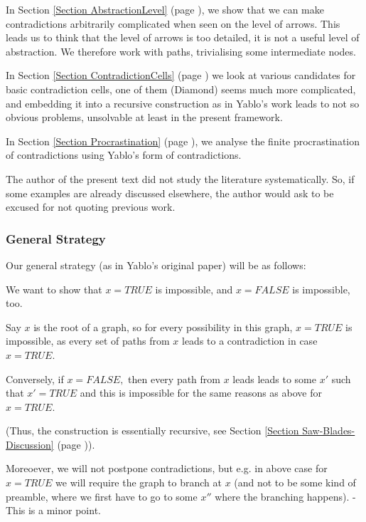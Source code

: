 In Section 
\ref{Section AbstractionLevel} (page 
\pageref{Section AbstractionLevel}),
we show that we can make contradictions arbitrarily complicated when
seen on the level of arrows. This leads us to think that the level of
arrows
is too detailed, it is not a useful level of abstraction.
We therefore work with paths, trivialising some intermediate nodes.


In Section 
\ref{Section ContradictionCells} (page 
\pageref{Section ContradictionCells})
we look at various candidates for basic contradiction cells,
one of them (Diamond) seems much
more complicated, and embedding it into a recursive construction as in
Yablo's work leads to not so obvious problems, unsolvable at least in the
present framework.


In Section 
\ref{Section Procrastination} (page 
\pageref{Section Procrastination}),
we analyse the finite procrastination of contradictions using Yablo's form
of
contradictions.


The author of the present text did not study the literature
systematically. So,
if some examples are already discussed elsewhere, the author would ask to
be
excused for not quoting previous work.
\subsubsection{
General Strategy
}


Our general strategy (as in Yablo's original paper) will be as follows:

 \xEh
 \xDH
We want to show that $x=TRUE$ is impossible, and $x=FALSE$ is impossible,
too.

 \xDH
Say $x$ is the root of a graph, so for every possibility in this graph,
$x=TRUE$ is impossible, as every set of paths from $x$ leads to a
contradiction in
case $x=TRUE.$

 \xDH
Conversely, if $x=FALSE,$ then every path from $x$ leads leads to some $x'
$
such that $x' =TRUE$ and this is impossible for the same reasons as above
for $x=TRUE.$

(Thus, the construction is essentially recursive,
see Section 
\ref{Section Saw-Blades-Discussion} (page 
\pageref{Section Saw-Blades-Discussion})).

 \xDH
Moreoever, we will not postpone contradictions, but e.g. in above case
for $x=TRUE$ we will require the graph to branch at $x$ (and not to be
some kind of preamble, where we first have to go to some $x'' $ where the
branching happens). - This is a minor point.

